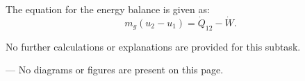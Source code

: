 The equation for the energy balance is given as:  
\[
m_g (u_2 - u_1) = \dot{Q}_{12} - \dot{W}.
\]  

No further calculations or explanations are provided for this subtask.  

---  
No diagrams or figures are present on this page.